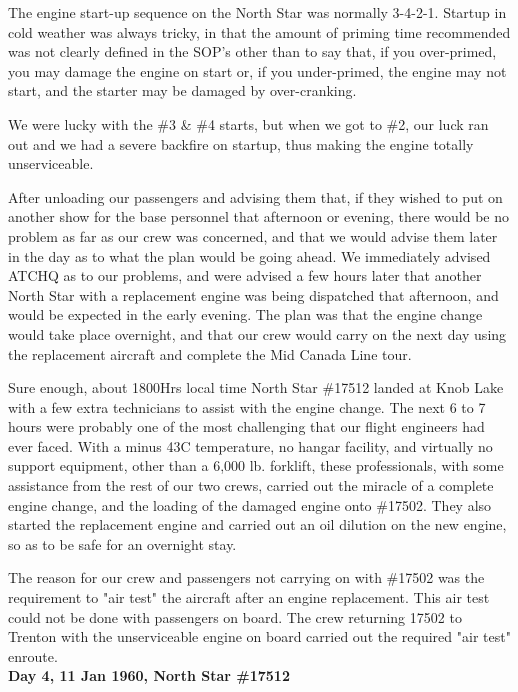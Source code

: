 The engine start-up sequence on the North Star was normally 3-4-2-1.
Startup in cold weather was always tricky, in that the amount of
priming time recommended was not clearly defined in the SOP's other
than to say that, if you over-primed, you may damage the engine on
start or, if you under-primed, the engine may not start, and the
starter may be damaged by over-cranking.

We were lucky with the \#3 \& \#4 starts, but when we got to \#2, our luck
ran out and we had a severe backfire on startup, thus making the engine
totally unserviceable.

After unloading our passengers and advising them that, if they wished
to put on another show for the base personnel that afternoon or
evening, there would be no problem as far as our crew was concerned,
and that we would advise them later in the day as to what the plan
would be going ahead. We immediately advised ATCHQ as to our problems,
and were advised a few hours later that another North Star with a
replacement engine was being dispatched that afternoon, and would be
expected in the early evening. The plan was that the engine change
would take place overnight, and that our crew would carry on the next
day using the replacement aircraft and complete the Mid Canada Line
tour.

Sure enough, about 1800Hrs local time North Star \#17512 landed at Knob
Lake with a few extra technicians to assist with the engine change. The
next 6 to 7 hours were probably one of the most challenging that our
flight engineers had ever faced. With a minus 43C temperature, no
hangar facility, and virtually no support equipment, other than a 6,000
lb. forklift, these professionals, with some assistance from the rest
of our two crews, carried out the miracle of a complete engine change,
and the loading of the damaged engine onto \#17502. They also started
the replacement engine and carried out an oil dilution on the new
engine, so as to be safe for an overnight stay.

The reason for our crew and passengers not carrying on with \#17502 was
the requirement to "air test" the aircraft after an engine replacement.
This air test could not be done with passengers on board. The crew
returning 17502 to Trenton with the unserviceable engine on board
carried out the required "air test" enroute.\\

\noindent\textbf{Day 4, 11 Jan 1960, North Star \#17512}\\

